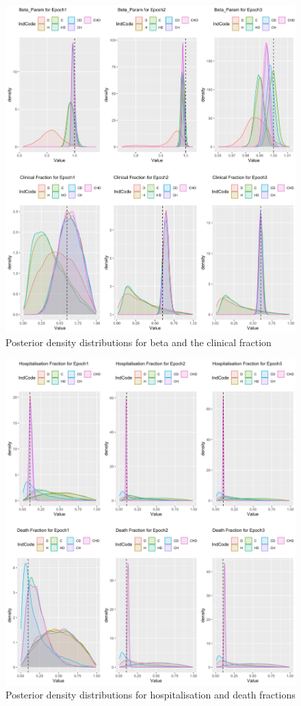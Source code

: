 \documentclass[10pt,letterpaper]{article}
\begin{document}
\begin{figure}
\includegraphics[width=0.85\linewidth]{diagrams/exp_density_b_cf} \caption{Posterior density distributions for beta and the clinical fraction}\label{fig:exp-density-1}
\end{figure}

\begin{figure}
\includegraphics[width=0.85\linewidth]{diagrams/exp_density_hf_df} \caption{Posterior density distributions for hospitalisation and death fractions}\label{fig:exp-density-2}
\end{figure}
\end{document}
